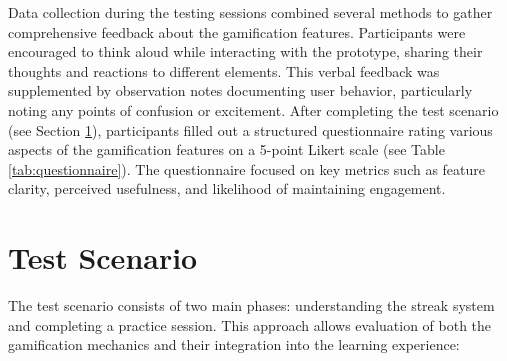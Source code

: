 Data collection during the testing sessions combined several methods to gather comprehensive feedback about the gamification features. Participants were encouraged to think aloud while interacting with the prototype, sharing their thoughts and reactions to different elements. This verbal feedback was supplemented by observation notes documenting user behavior, particularly noting any points of confusion or excitement. After completing the test scenario (see Section \ref{sec:test-scenario}), participants filled out a structured questionnaire rating various aspects of the gamification features on a 5-point Likert scale (see Table \ref{tab:questionnaire}). The questionnaire focused on key metrics such as feature clarity, perceived usefulness, and likelihood of maintaining engagement.



\section{Test Scenario}
\label{sec:test-scenario}
The test scenario consists of two main phases: understanding the streak system and completing a practice session. This approach allows evaluation of both the gamification mechanics and their integration into the learning experience:


